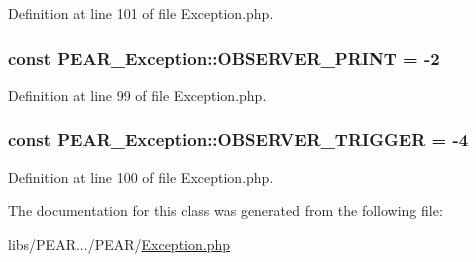 Definition at line 101 of file Exception.\-php.

\hypertarget{classPEAR__Exception_afaa71d35f3fab453da2cef325b210423}{
\subsubsection[{O\-B\-S\-E\-R\-V\-E\-R\-\_\-\-P\-R\-I\-N\-T}]{\setlength{\rightskip}{0pt plus 5cm}const P\-E\-A\-R\-\_\-\-Exception\-::\-O\-B\-S\-E\-R\-V\-E\-R\-\_\-\-P\-R\-I\-N\-T = -\/2}}\label{classPEAR__Exception_afaa71d35f3fab453da2cef325b210423}


Definition at line 99 of file Exception.\-php.

\hypertarget{classPEAR__Exception_a0bf6d43a80c7f3bc2c7cfae062ff4477}{
\subsubsection[{O\-B\-S\-E\-R\-V\-E\-R\-\_\-\-T\-R\-I\-G\-G\-E\-R}]{\setlength{\rightskip}{0pt plus 5cm}const P\-E\-A\-R\-\_\-\-Exception\-::\-O\-B\-S\-E\-R\-V\-E\-R\-\_\-\-T\-R\-I\-G\-G\-E\-R = -\/4}}\label{classPEAR__Exception_a0bf6d43a80c7f3bc2c7cfae062ff4477}


Definition at line 100 of file Exception.\-php.



The documentation for this class was generated from the following file\-:\begin{DoxyCompactItemize}
\item 
libs/\-P\-E\-A\-R.../\-P\-E\-A\-R/\hyperlink{PEAR_2Exception_8php}{Exception.\-php}\end{DoxyCompactItemize}

